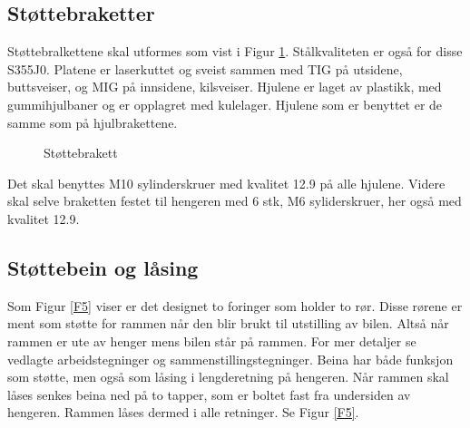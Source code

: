 \subsection{Støttebraketter}

Støttebralkettene skal utformes som vist i Figur \ref{F4}. Stålkvaliteten er også for disse S355J0. Platene er laserkuttet og sveist sammen med TIG på utsidene, buttsveiser, og MIG på innsidene, kilsveiser. Hjulene er laget av plastikk, med gummihjulbaner og er opplagret med kulelager. Hjulene som er benyttet er de samme som på hjulbrakettene.

\begin{figure}[h!]
\centering   
{}
\caption{Støttebrakett}
\label{F4}
\end{figure}

Det skal benyttes M10 sylinderskruer med kvalitet 12.9 på alle hjulene. Videre skal selve braketten festet til hengeren med 6 stk, M6 syliderskruer, her også med kvalitet 12.9.    

\subsection{Støttebein og låsing}

Som Figur \ref{F5} viser er det designet to foringer som holder to rør. Disse rørene er ment som støtte for rammen når den blir brukt til utstilling av bilen. Altså når rammen er ute av henger mens bilen står på rammen. For mer detaljer se vedlagte arbeidstegninger og sammenstillingstegninger. Beina har både funksjon som støtte, men også som låsing i lengderetning på hengeren. Når rammen skal låses senkes beina ned på to tapper, som er boltet fast fra undersiden av hengeren. Rammen låses dermed i alle retninger. Se Figur \ref{F5}.

